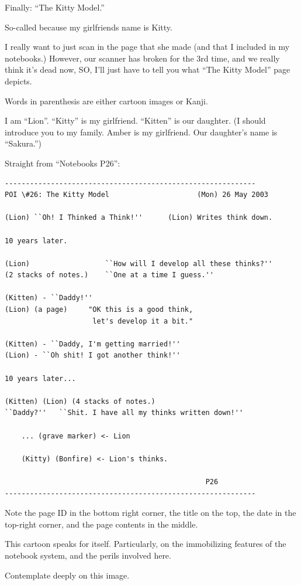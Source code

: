 \documentclass[oneside]{book}
\begin{document}
Finally: ``The Kitty Model.''

So-called because my girlfriends name is Kitty.

I really want to just scan in the page that she made (and that I
included in my notebooks.) However, our scanner has broken for the 3rd
time, and we really think it's dead now, SO, I'll just have to tell
you what ``The Kitty Model'' page depicts.

Words in parenthesis are either cartoon images or Kanji.

I am ``Lion''. ``Kitty'' is my girlfriend. ``Kitten'' is our daughter. (I
should introduce you to my family. Amber is my girlfriend. Our
daughter's name is ``Sakura.'')

Straight from ``Notebooks P26'':

\begin{verbatim}
------------------------------------------------------------
POI \#26: The Kitty Model                     (Mon) 26 May 2003

(Lion) ``Oh! I Thinked a Think!''      (Lion) Writes think down.

10 years later.

(Lion)                  ``How will I develop all these thinks?''
(2 stacks of notes.)    ``One at a time I guess.''

(Kitten) - ``Daddy!''
(Lion) (a page)     "OK this is a good think,
                     let's develop it a bit."

(Kitten) - ``Daddy, I'm getting married!''
(Lion) - ``Oh shit! I got another think!''

10 years later...

(Kitten) (Lion) (4 stacks of notes.)
``Daddy?''   ``Shit. I have all my thinks written down!''

    ... (grave marker) <- Lion

    (Kitty) (Bonfire) <- Lion's thinks.

                                                P26
------------------------------------------------------------
\end{verbatim}

Note the page ID in the bottom right corner, the title on the top, the
date in the top-right corner, and the page contents in the middle.

This cartoon speaks for itself. Particularly, on the immobilizing
features of the notebook system, and the perils involved here.

Contemplate deeply on this image.
\end{document}
